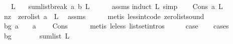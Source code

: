 \begin{isabellebody}
\ \ \ {\isachardoublequoteopen}L\ {\isasymnoteq}\ {\isacharbrackleft}{\kern0pt}{\isacharbrackright}{\kern0pt}{\isachardoublequoteclose}\isanewline
{}\ {\isachardoublequoteopen}sumlist{\isacharunderscore}{\kern0pt}break\ a\ b\ L\ {\isacharequal}{\kern0pt}\ {}{\isachardoublequoteclose}\isanewline
%
\isadelimproof
\ \ %
\endisadelimproof
%
\isatagproof
{}\isamarkupfalse%
\ assms\isanewline
{}\isamarkupfalse%
{\isacharparenleft}{\kern0pt}induct\ L{\isacharcomma}{\kern0pt}\ simp{\isacharparenright}{\kern0pt}\isanewline
\ \ \isamarkupfalse%
\ {\isacharparenleft}{\kern0pt}Cons\ a{}\ L{\isacharparenright}{\kern0pt}\isanewline
\ \ \isamarkupfalse%
\ \isamarkupfalse%
\ nz{\isacharcolon}{\kern0pt}\ {\isachardoublequoteopen}{\isasymnot}\ zero{\isacharunderscore}{\kern0pt}list\ {\isacharparenleft}{\kern0pt}a{}\ {\isacharhash}{\kern0pt}\ L{\isacharparenright}{\kern0pt}{\isachardoublequoteclose}\ \isamarkupfalse%
\ assms\isanewline
\ \ \ \ \isamarkupfalse%
\ {\isacharparenleft}{\kern0pt}metis\ less{\isacharunderscore}{\kern0pt}int{\isacharunderscore}{\kern0pt}code{\isacharparenleft}{\kern0pt}{}{\isacharparenright}{\kern0pt}\ zero{\isacharunderscore}{\kern0pt}list{\isacharunderscore}{\kern0pt}sound{\isacharparenright}{\kern0pt}\isanewline
\ \ \isamarkupfalse%
\ {\isacharparenleft}{\kern0pt}bg{\isacharparenright}{\kern0pt}\ {\isachardoublequoteopen}a{}\ {\isachargreater}{\kern0pt}\ {}{\isachardoublequoteclose}\ {\isacharbar}{\kern0pt}\ {\isachardoublequoteopen}a{}\ {\isacharequal}{\kern0pt}\ {}{\isachardoublequoteclose}\ \isamarkupfalse%
\ Cons\isanewline
\ \ \ \ \isamarkupfalse%
\ {\isacharparenleft}{\kern0pt}metis\ le{\isacharunderscore}{\kern0pt}less\ list{\isachardot}{\kern0pt}set{\isacharunderscore}{\kern0pt}intros{\isacharparenleft}{\kern0pt}{}{\isacharparenright}{\kern0pt}{\isacharparenright}{\kern0pt}\isanewline
\ \ \isamarkupfalse%
\ \isamarkupfalse%
\ {\isacharquery}{\kern0pt}case\ \isanewline
\ \ \isamarkupfalse%
{\isacharparenleft}{\kern0pt}cases{\isacharparenright}{\kern0pt}\isanewline
\ \ \ \ \isamarkupfalse%
\ bg\isanewline
\ \ \ \ \isamarkupfalse%
\ \isamarkupfalse%
\ {\isachardoublequoteopen}sum{\isacharunderscore}{\kern0pt}list\ L\ {\isasymge}\ {}\ {\isachardoublequoteclose}\ \isamarkupfalse%

\end{isabellebody}
